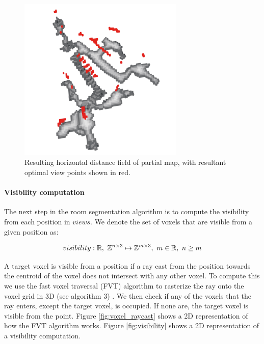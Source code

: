 \begin{figure}[h]
    \centering
    \includegraphics*[width=0.7\textwidth]{./fig/horizontal_distance_field.png}
    \caption{Resulting horizontal distance field of partial map, with resultant optimal view points shown in red.}
    \label{fig:hdf}
\end{figure}

\paragraph{Visibility computation}
The next step in the room segmentation algorithm is to compute the visibility from each position in \(views\). We denote the set of voxels that are visible from a given position as:

\begin{equation}
    \label{eq:visibility}
    visibility: \mathbb{R},\ \voxelset \mapsto \mathbb{Z}^{m \times 3},\ m \in \mathbb{R},\ n \geq m
\end{equation}

A target voxel is visible from a position if a ray cast from the position towards the centroid of the voxel does not intersect with any other voxel. To compute this we use the fast voxel traversal (FVT) algorithm to rasterize the ray onto the voxel grid in 3D (see algorithm 3) \citep{amanatides_fast_1987}. We then check if any of the voxels that the ray enters, except the target voxel, is occupied. If none are, the target voxel is visible from the point. Figure \ref{fig:voxel_raycast} shows a 2D representation of how the FVT algorithm works. Figure \ref{fig:visibility} shows a 2D representation of a visibility computation.

